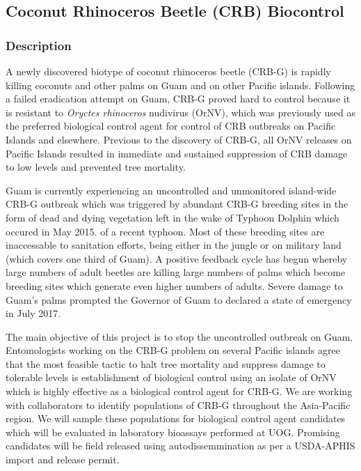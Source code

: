 \subsection{Coconut Rhinoceros Beetle (CRB) Biocontrol}
\begin{refsection}
	
\subsubsection{Description}

A newly discovered biotype of coconut rhinoceros beetle (CRB-G) is
rapidly killing coconuts and other palms on Guam and on other Pacific
islands. Following a failed eradication attempt on Guam, CRB-G proved
hard to control because it is resistant to \emph{Oryctes rhinoceros}
nudivirus (OrNV), which was previously used as the preferred biological
control agent for control of CRB outbreaks on Pacific Islands and
elsewhere. Previous to the discovery of CRB-G, all OrNV releases on
Pacific Islands resulted in immediate and sustained suppression of
CRB damage to low levels and prevented tree mortality.

Guam is currently experiencing an uncontrolled and unmonitored island-wide
CRB-G outbreak which was triggered by abundant CRB-G breeding sites
in the form of dead and dying vegetation left in the wake of Typhoon
Dolphin which occured in May 2015. of a recent typhoon. Most of these
breeding sites are inaccessable to sanitation efforts, being either
in the jungle or on military land (which covers one third of Guam).
A positive feedback cycle has begun whereby large numbers of adult
beetles are killing large numbers of palms which become breeding sites
which generate even higher numbers of adults. Severe damage to Guam\textquoteright s
palms prompted the Governor of Guam to declared a state of emergency
in July 2017.

The main objective of this project is to stop the uncontrolled outbreak
on Guam. Entomologists working on the CRB-G problem on several Pacific
islands agree that the most feasible tactic to halt tree mortality
and suppress damage to tolerable levels is establishment of biological
control using an isolate of OrNV which is highly effective as a biological
control agent for CRB-G. We are working with collaborators to identify
populations of CRB-G throughout the Asia-Pacific region. We will sample
these populations for biological control agent candidates which will
be evaluated in laboratory bioassays performed at UOG. Promising candidates
will be field released using autodissemmination as per a USDA-APHIS
import and release permit.


\end{refsection}
